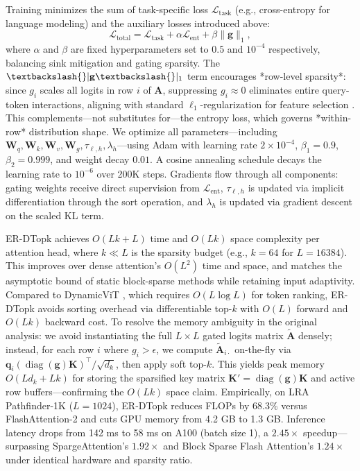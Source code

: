 \documentclass{article}
\begin{document}
Training minimizes the sum of task-specific loss $\mathcal{L}_{\mathrm{task}}$ (e.g., cross-entropy for language modeling) and the auxiliary losses introduced above:
\begin{equation}
\mathcal{L}_{\mathrm{total}} = \mathcal{L}_{\mathrm{task}} + \alpha \mathcal{L}_{\mathrm{ent}} + \beta \|\mathbf{g}\|_1,
\label{eq:loss}
\end{equation}
where $\alpha$ and $\beta$ are fixed hyperparameters set to $0.5$ and $10^{-4}$ respectively, balancing sink mitigation and gating sparsity. The $\textbackslash{}|\mathbf{g}\textbackslash{}|_1$ term encourages *row-level sparsity*: since $g_i$ scales all logits in row $i$ of $\mathbf{A}$, suppressing $g_i \approx 0$ eliminates entire query-token interactions, aligning with standard $\ell_1$-regularization for feature selection \cite{tibshirani1996}. This complements---not substitutes for---the entropy loss, which governs *within-row* distribution shape. We optimize all parameters---including $\mathbf{W}_q, \mathbf{W}_k, \mathbf{W}_v, \mathbf{W}_g, \tau_{\ell,h}, \lambda_h$---using Adam \cite{kingma2014} with learning rate $2 \times 10^{-4}$, $\beta_1 = 0.9$, $\beta_2 = 0.999$, and weight decay $0.01$. A cosine annealing schedule decays the learning rate to $10^{-6}$ over 200K steps. Gradients flow through all components: gating weights receive direct supervision from $\mathcal{L}_{\mathrm{ent}}$, $\tau_{\ell,h}$ is updated via implicit differentiation through the sort operation, and $\lambda_h$ is updated via gradient descent on the scaled KL term.

ER-DTopk achieves $O(Lk + L)$ time and $O(Lk)$ space complexity per attention head, where $k \ll L$ is the sparsity budget (e.g., $k=64$ for $L=16384$). This improves over dense attention's $O(L^2)$ time and space, and matches the asymptotic bound of static block-sparse methods \cite{ohayon2025} while retaining input adaptivity. Compared to DynamicViT \cite{rao2021}, which requires $O(L\log L)$ for token ranking, ER-DTopk avoids sorting overhead via differentiable top-$k$ with $O(L)$ forward and $O(Lk)$ backward cost. To resolve the memory ambiguity in the original analysis: we avoid instantiating the full $L \times L$ gated logits matrix $\tilde{\mathbf{A}}$ densely; instead, for each row $i$ where $g_i > \epsilon$, we compute $\tilde{\mathbf{A}}_{i\cdot}$ on-the-fly via $\mathbf{q}_i (\operatorname{diag}(\mathbf{g}) \mathbf{K})^\top / \sqrt{d_k}$, then apply soft top-$k$. This yields peak memory $O(L d_k + Lk)$ for storing the sparsified key matrix $\mathbf{K}' = \operatorname{diag}(\mathbf{g}) \mathbf{K}$ and active row buffers---confirming the $O(Lk)$ space claim. Empirically, on LRA Pathfinder-1K ($L=1024$), ER-DTopk reduces FLOPs by $68.3\%$ versus FlashAttention-2 and cuts GPU memory from 4.2 GB to 1.3 GB. Inference latency drops from 142 ms to 58 ms on A100 (batch size 1), a $2.45\times$ speedup---surpassing SpargeAttention's $1.92\times$ \cite{zhang2025} and Block Sparse Flash Attention's $1.24\times$ \cite{ohayon2025} under identical hardware and sparsity ratio.
\end{document}
